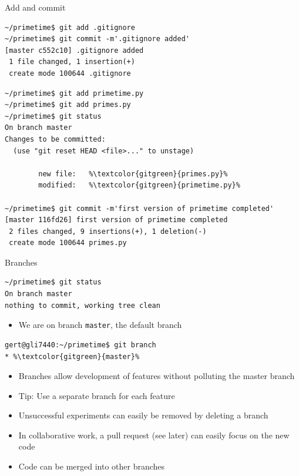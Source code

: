 \documentclass[svgnames]{beamer}
\begin{document}
\begin{frame}[fragile]{Add and commit}
 \begin{lstlisting}
~/primetime$ git add .gitignore
~/primetime$ git commit -m'.gitignore added'
[master c552c10] .gitignore added
 1 file changed, 1 insertion(+)
 create mode 100644 .gitignore
 \end{lstlisting}
 \begin{lstlisting}[escapechar=\%]
~/primetime$ git add primetime.py
~/primetime$ git add primes.py
~/primetime$ git status
On branch master
Changes to be committed:
  (use "git reset HEAD <file>..." to unstage)

        new file:   %\textcolor{gitgreen}{primes.py}%
        modified:   %\textcolor{gitgreen}{primetime.py}%

~/primetime$ git commit -m'first version of primetime completed'
[master 116fd26] first version of primetime completed
 2 files changed, 9 insertions(+), 1 deletion(-)
 create mode 100644 primes.py
 \end{lstlisting}
\end{frame}

\begin{frame}[fragile]{Branches}
 \begin{lstlisting}
~/primetime$ git status
On branch master
nothing to commit, working tree clean
 \end{lstlisting}
 \begin{itemize}
  \item We are on branch \texttt{master}, the default branch
 \end{itemize}
 \begin{lstlisting}[escapechar=\%]
gert@gli7440:~/primetime$ git branch
* %\textcolor{gitgreen}{master}%
 \end{lstlisting}
 \begin{itemize}
  \item Branches allow development of features without polluting
        the master branch
  \item Tip: Use a separate branch for each feature
  \item Unsuccessful experiments can easily be removed by deleting
        a branch
  \item In collaborative work, a pull request (see later) can easily
        focus on the new code
  \item Code can be merged into other branches
 \end{itemize}
\end{frame}
\end{document}
